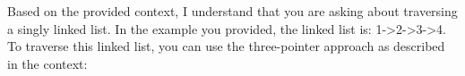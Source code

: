 \documentclass[preview]{standalone}
\begin{document}
Based on the provided context, I understand that you are asking about traversing a singly linked list. In the example you provided, the linked list is: 1->2->3->4. To traverse this linked list, you can use the three-pointer approach as described in the context:\\
\end{document}
